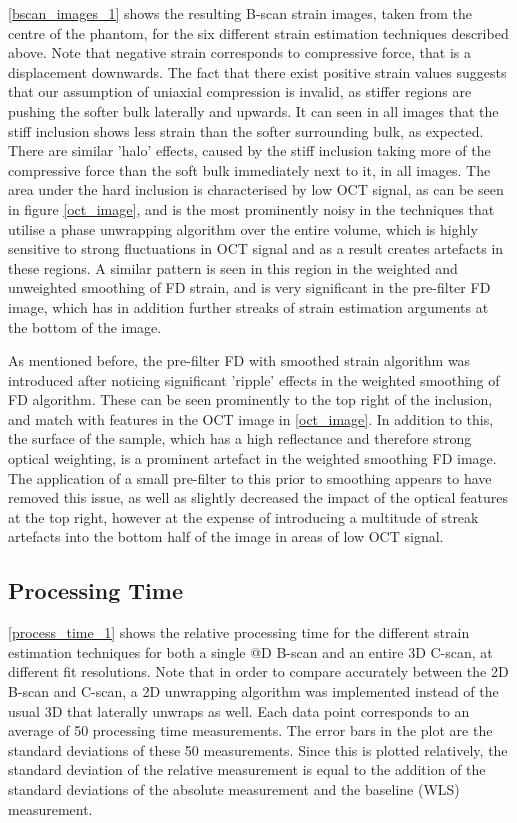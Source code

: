 \autoref{bscan_images_1} shows the resulting B-scan strain images, taken from the centre of the phantom, for the six different strain estimation techniques described above. Note that negative strain corresponds to compressive force, that is a displacement downwards. The fact that there exist positive strain values suggests that our assumption of uniaxial compression is invalid, as stiffer regions are pushing the softer bulk laterally and upwards. It can seen in all images that the stiff inclusion shows less strain than the softer surrounding bulk, as expected. There are similar 'halo' effects, caused by the stiff inclusion taking more of the compressive force than the soft bulk immediately next to it, in all images. The area under the hard inclusion is characterised by low OCT signal, as can be seen in figure \autoref{oct_image}, and is the most prominently noisy in the techniques that utilise a phase unwrapping algorithm over the entire volume, which is highly sensitive to strong fluctuations in OCT signal and as a result creates artefacts in these regions. A similar pattern is seen in this region in the weighted and unweighted smoothing of FD strain, and is very significant in the pre-filter FD image, which has in addition further streaks of strain estimation arguments at the bottom of the image. 

As mentioned before, the pre-filter FD with smoothed strain algorithm was introduced after noticing significant 'ripple' effects in the weighted smoothing of FD algorithm. These can be seen prominently to the top right of the inclusion, and match with features in the OCT image in \autoref{oct_image}. In addition to this, the surface of the sample, which has a high reflectance and therefore strong optical weighting, is a  prominent artefact in the weighted smoothing FD image. The application of a small pre-filter to this prior to smoothing appears to have removed this issue, as well as slightly decreased the impact of the optical features at the top right, however at the expense of introducing a multitude of streak artefacts into the bottom half of the image in areas of low OCT signal.

\subsection{Processing Time}

\autoref{process_time_1} shows the relative processing time for the different strain estimation techniques for both a single @D B-scan and an entire 3D C-scan, at different fit resolutions. Note that in order to compare accurately between the 2D B-scan and C-scan, a 2D unwrapping algorithm was implemented instead of the usual 3D that laterally unwraps as well. Each data point corresponds to an average of 50 processing time measurements. The error bars in the plot are the standard deviations of these 50 measurements. Since this is plotted relatively, the standard deviation of the relative measurement is equal to the addition of the standard deviations of the absolute measurement and the baseline (WLS) measurement.

